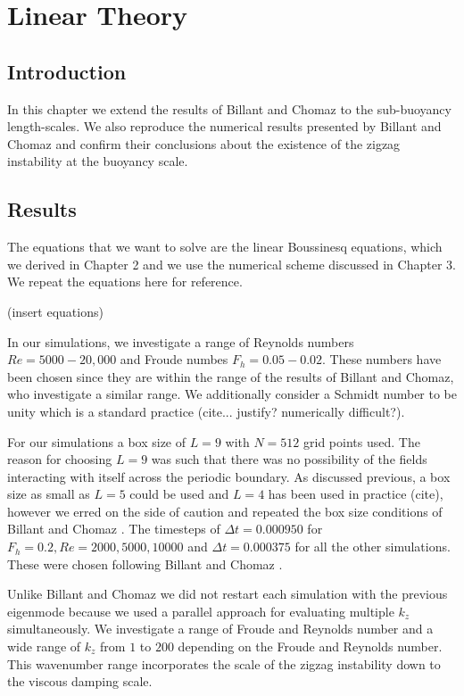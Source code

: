 \chapter{Linear Theory}

\section{Introduction}
In this chapter we extend the results of Billant and Chomaz \cite{2000c} to the sub-buoyancy length-scales. We also reproduce the numerical results presented by Billant and Chomaz and confirm their conclusions about the existence of the zigzag instability at the buoyancy scale. 

\section{Results}
The equations that we want to solve are the linear Boussinesq equations, which we derived in Chapter 2 and we use the numerical scheme discussed in Chapter 3. We repeat the equations here for reference. 

(insert equations)

In our simulations, we investigate a range of Reynolds numbers $Re=5000-20{,}000$ and Froude numbes $F_{h}=0.05-0.02$. These numbers have been chosen since they are within the range of the results of Billant and Chomaz, who investigate a similar range. We additionally consider a Schmidt number to be unity which is a standard practice (cite... justify? numerically difficult?). 

For our simulations a box size of $L=9$ with $N=512$ grid points used. The reason for choosing $L=9$ was such that there was no possibility of the fields interacting with itself across the periodic boundary. As discussed previous, a box size as small as $L=5$ could be used and $L=4$ has been used in practice (cite), however we erred on the side of caution and repeated the box size conditions of Billant and Chomaz \cite{bc2000c}.  The timesteps of $\Delta t=0.000950$ for $F_{h}=0.2,Re=2000,5000,10000$ and $\Delta t=0.000375$ for all the other simulations. These were chosen following Billant and Chomaz \cite{bc2000c}. 

Unlike Billant and Chomaz\cite{bc2000c} we did not restart each simulation with the previous eigenmode because we used a parallel approach for evaluating multiple $k_{z}$ simultaneously. We investigate a range of Froude and Reynolds number and a wide range of $k_{z}$ from $1$ to $200$ depending on the Froude and Reynolds number. This wavenumber range incorporates the scale of the zigzag instability down to the viscous damping scale. 

